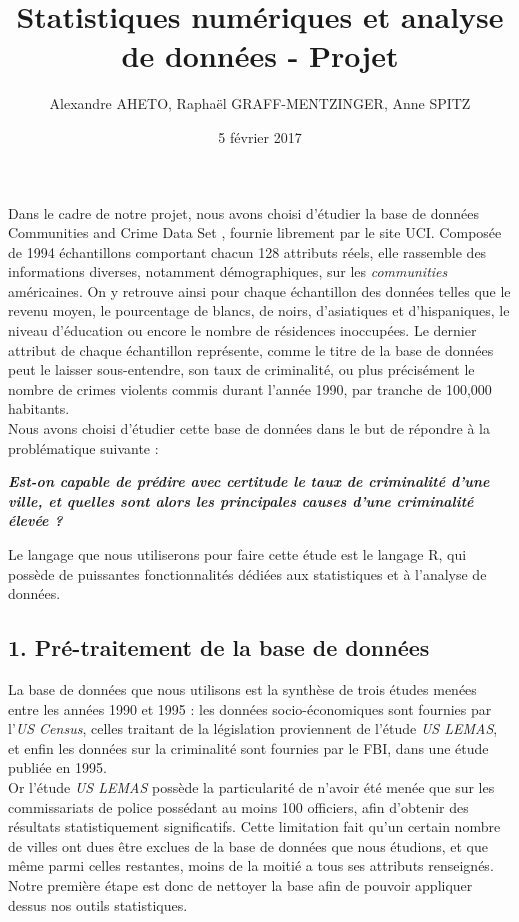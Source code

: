 \documentclass[a4paper,12pt]{article}
\title{Statistiques numériques et analyse de données - Projet}
\author{Alexandre AHETO, Raphaël GRAFF-MENTZINGER, Anne SPITZ}
\date{5 février 2017}
\begin{document}
 \maketitle

Dans le cadre de notre projet, nous avons choisi d'étudier la base de données \og Communities and Crime Data Set \fg{}, fournie librement par le site UCI. Composée de 1994 échantillons comportant chacun 128 attributs réels, elle rassemble des informations diverses, notamment démographiques, sur les \emph{communities} américaines. On y retrouve ainsi pour chaque échantillon des données telles que le revenu moyen, le pourcentage de blancs, de noirs, d'asiatiques et d'hispaniques, le niveau d'éducation ou encore le nombre de résidences inoccupées. Le dernier attribut de chaque échantillon représente, comme le titre de la base de données peut le laisser sous-entendre, son taux de criminalité, ou plus précisément le nombre de crimes violents commis durant l'année 1990, par tranche de 100,000 habitants.
\ \\

Nous avons choisi d'étudier cette base de données dans le but de répondre à la problématique suivante :

\begin{center}
\textbf{\textit{Est-on capable de prédire avec certitude le taux de criminalité d'une ville, et quelles sont alors les principales causes d'une criminalité élevée ?}}
\end{center}

Le langage que nous utiliserons pour faire cette étude est le langage R, qui possède de puissantes fonctionnalités dédiées aux statistiques et à l'analyse de données.

\subsection*{1. Pré-traitement de la base de données}

La base de données que nous utilisons est la synthèse de trois études menées entre les années 1990 et 1995 : les données socio-économiques sont fournies par l'\emph{US Census}, celles traitant de la législation proviennent de l'étude \emph{US LEMAS}, et enfin les données sur la criminalité sont fournies par le FBI, dans une étude publiée en 1995.
\ \\

Or l'étude \emph{US LEMAS} possède la particularité de n'avoir été menée que sur les commissariats de police possédant au moins 100 officiers, afin d'obtenir des résultats statistiquement significatifs. Cette limitation fait qu'un certain nombre de villes ont dues être exclues de la base de données que nous étudions, et que même parmi celles restantes, moins de la moitié a tous ses attributs renseignés. Notre première étape est donc de \og nettoyer \fg{} la base afin de pouvoir appliquer dessus nos outils statistiques.
\ \\
\end{document}
